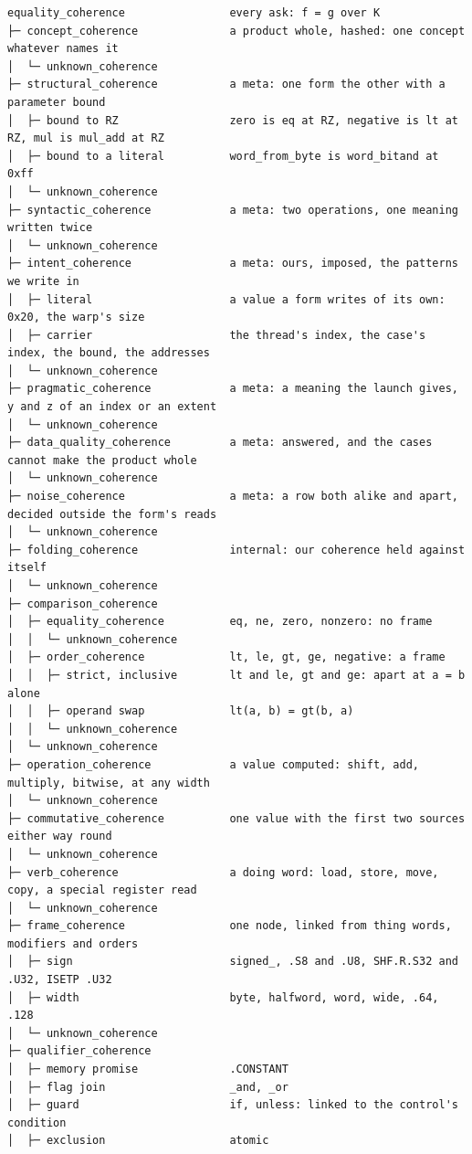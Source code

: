 \begin{Verbatim}
equality_coherence                every ask: f = g over K
├─ concept_coherence              a product whole, hashed: one concept whatever names it
│  └─ unknown_coherence
├─ structural_coherence           a meta: one form the other with a parameter bound
│  ├─ bound to RZ                 zero is eq at RZ, negative is lt at RZ, mul is mul_add at RZ
│  ├─ bound to a literal          word_from_byte is word_bitand at 0xff
│  └─ unknown_coherence
├─ syntactic_coherence            a meta: two operations, one meaning written twice
│  └─ unknown_coherence
├─ intent_coherence               a meta: ours, imposed, the patterns we write in
│  ├─ literal                     a value a form writes of its own: 0x20, the warp's size
│  ├─ carrier                     the thread's index, the case's index, the bound, the addresses
│  └─ unknown_coherence
├─ pragmatic_coherence            a meta: a meaning the launch gives, y and z of an index or an extent
│  └─ unknown_coherence
├─ data_quality_coherence         a meta: answered, and the cases cannot make the product whole
│  └─ unknown_coherence
├─ noise_coherence                a meta: a row both alike and apart, decided outside the form's reads
│  └─ unknown_coherence
├─ folding_coherence              internal: our coherence held against itself
│  └─ unknown_coherence
├─ comparison_coherence
│  ├─ equality_coherence          eq, ne, zero, nonzero: no frame
│  │  └─ unknown_coherence
│  ├─ order_coherence             lt, le, gt, ge, negative: a frame
│  │  ├─ strict, inclusive        lt and le, gt and ge: apart at a = b alone
│  │  ├─ operand swap             lt(a, b) = gt(b, a)
│  │  └─ unknown_coherence
│  └─ unknown_coherence
├─ operation_coherence            a value computed: shift, add, multiply, bitwise, at any width
│  └─ unknown_coherence
├─ commutative_coherence          one value with the first two sources either way round
│  └─ unknown_coherence
├─ verb_coherence                 a doing word: load, store, move, copy, a special register read
│  └─ unknown_coherence
├─ frame_coherence                one node, linked from thing words, modifiers and orders
│  ├─ sign                        signed_, .S8 and .U8, SHF.R.S32 and .U32, ISETP .U32
│  ├─ width                       byte, halfword, word, wide, .64, .128
│  └─ unknown_coherence
├─ qualifier_coherence
│  ├─ memory promise              .CONSTANT
│  ├─ flag join                   _and, _or
│  ├─ guard                       if, unless: linked to the control's condition
│  ├─ exclusion                   atomic

\end{Verbatim}
